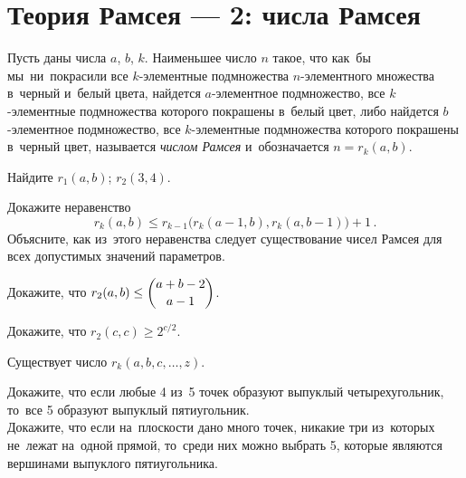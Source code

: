 
\section*{Теория Рамсея — 2: числа Рамсея}


Пусть даны числа $a$, $b$, $k$.
Наименьшее число $n$ такое, что как~бы мы~ни~покрасили все
$k$-элементные подмножества $n$-элементного множества в~черный и~белый цвета,
найдется $a$-элементное подмножество, все $k$-элементные подмножества
которого покрашены в~белый цвет, либо найдется $b$-элементное подмножество,
все $k$-элементные подмножества которого покрашены в~черный цвет, называется
\emph{числом Рамсея} и~обозначается $n = r_k(a, b)$.

\begin{problems}

\item
Найдите
\quad
\subproblem $r_1(a, b)$;
\quad
\subproblem $r_2(3, 4)$.

\item
Докажите неравенство
\[
    r_{k}(a, b)
\leq
    r_{k-1} \bigl( r_{k}(a - 1, b), r_k(a, b - 1) \bigr) + 1
\, . \]
Объясните, как из~этого неравенства следует существование чисел Рамсея для всех
допустимых значений параметров.

\item
Докажите, что
\(
    r_2(a, b) \leq \dbinom{a + b - 2}{a - 1}
\)\;.

\item
Докажите, что $r_2(c, c) \geq 2^{c / 2}$.

\item{}
Существует число $r_k(a, b, c, \ldots, z)$.


\item{}
\subproblem
Докажите, что если любые 4 из~5 точек образуют выпуклый четырехугольник,
то~все 5 образуют выпуклый пятиугольник.
\\
\subproblem
Докажите, что если на~плоскости дано много точек, никакие три из~которых
не~лежат на~одной прямой, то~среди них можно выбрать 5, которые являются
вершинами выпуклого пятиугольника.

\end{problems}

